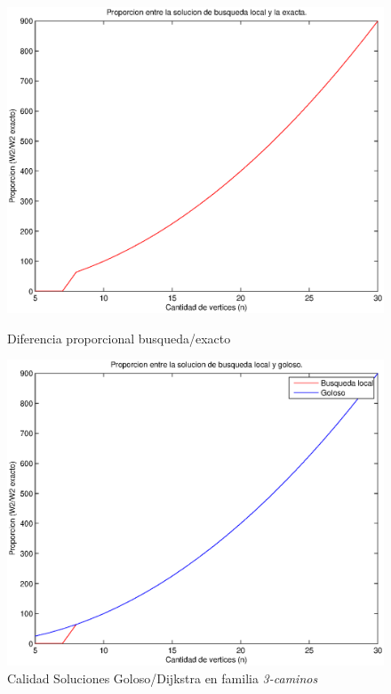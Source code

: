 \begin{figure}[H]
  \begin{minipage}{0.5\linewidth}
    \includegraphics[width=\linewidth]{graficos/busq_local_proporcion.eps}
    \caption{Diferencia proporcional busqueda/exacto}\label{fig:busq-local-proporcion}
  \end{minipage}
  \hfill
  \begin{minipage}{0.5\linewidth}
    \includegraphics[width=\linewidth]{graficos/busq_local_proporcion_comparacion.eps}
    \caption{Calidad Soluciones Goloso/Dijkstra en familia \emph{3-caminos}}\label{fig:busq-local-proporcion-comparacion}
  \end{minipage}
\end{figure}

